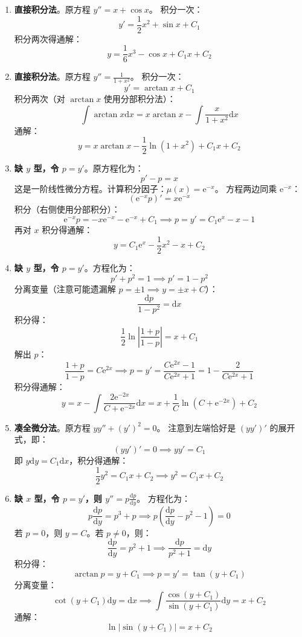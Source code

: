 \documentclass[lang=cn,11pt]{elegantbook}
\begin{document}
\begin{solution}
\begin{enumerate}
    \item[(1)] \textbf{直接积分法}。原方程 $y'' = x + \cos x$。
    积分一次：
    \[
    y' = \frac{1}{2}x^2 + \sin x + C_1
    \]
    积分两次得通解：
    \[
    y = \frac{1}{6}x^3 - \cos x + C_1 x + C_2
    \]
    
    \item[(2)] \textbf{直接积分法}。原方程 $y'' = \frac{1}{1+x^2}$。
    积分一次：
    \[
    y' = \arctan x + C_1
    \]
    积分两次（对 $\arctan x$ 使用分部积分法）：
    \[
    \int \arctan x \mathrm{d}x = x\arctan x - \int \frac{x}{1+x^2}\mathrm{d}x
    \]
    通解：
    \[
    y = x\arctan x - \frac{1}{2}\ln(1+x^2) + C_1 x + C_2
    \]
    
    \item[(3)] \textbf{缺 $y$ 型，令 $p=y'$}。原方程化为：
    \[
    p' - p = x
    \]
    这是一阶线性微分方程。计算积分因子：$\mu(x) = \mathrm{e}^{-x}$。
    方程两边同乘 $\mathrm{e}^{-x}$：
    \[
    (\mathrm{e}^{-x}p)' = x\mathrm{e}^{-x}
    \]
    积分（右侧使用分部积分）：
    \[
    \mathrm{e}^{-x}p = -x\mathrm{e}^{-x} - \mathrm{e}^{-x} + C_1 \implies p = y' = C_1\mathrm{e}^x - x - 1
    \]
    再对 $x$ 积分得通解：
    \[
    y = C_1\mathrm{e}^x - \frac{1}{2}x^2 - x + C_2
    \]
    
    \item[(4)] \textbf{缺 $y$ 型，令 $p=y'$}。方程化为：
    \[
    p' + p^2 = 1 \implies p' = 1-p^2
    \]
    分离变量（注意可能遗漏解 $p=\pm1 \implies y=\pm x+C$）：
    \[
    \frac{\mathrm{d}p}{1-p^2} = \mathrm{d}x
    \]
    积分得：
    \[
    \frac{1}{2}\ln\left|\frac{1+p}{1-p}\right| = x + C_1
    \]
    解出 $p$：
    \[
    \frac{1+p}{1-p} = C\mathrm{e}^{2x} \implies p = y' = \frac{C\mathrm{e}^{2x}-1}{C\mathrm{e}^{2x}+1} = 1 - \frac{2}{C\mathrm{e}^{2x}+1}
    \]
    积分得通解：
    \[
    y = x - \int \frac{2\mathrm{e}^{-2x}}{C+\mathrm{e}^{-2x}}\mathrm{d}x = x + \frac{1}{C}\ln(C+\mathrm{e}^{-2x}) + C_2
    \]
    
    \item[(5)] \textbf{凑全微分法}。原方程 $yy'' + (y')^2 = 0$。
    注意到左端恰好是 $(yy')'$ 的展开式，即：
    \[
    (yy')' = 0 \implies yy' = C_1
    \]
    即 $y\mathrm{d}y = C_1\mathrm{d}x$，积分得通解：
    \[
    \frac{1}{2}y^2 = C_1 x + C_2 \implies y^2 = C_1 x + C_2
    \]
    
    \item[(6)] \textbf{缺 $x$ 型，令 $p=y'$，则 $y''=p\frac{\mathrm{d}p}{\mathrm{d}y}$}。
    方程化为：
    \[
    p\frac{\mathrm{d}p}{\mathrm{d}y} = p^3 + p \implies p\left(\frac{\mathrm{d}p}{\mathrm{d}y} - p^2 - 1\right) = 0
    \]
    若 $p=0$，则 $y=C$。若 $p \neq 0$，则：
    \[
    \frac{\mathrm{d}p}{\mathrm{d}y} = p^2 + 1 \implies \frac{\mathrm{d}p}{p^2+1} = \mathrm{d}y
    \]
    积分得：
    \[
    \arctan p = y + C_1 \implies p = y' = \tan(y+C_1)
    \]
    分离变量：
    \[
    \cot(y+C_1)\mathrm{d}y = \mathrm{d}x \implies \int \frac{\cos(y+C_1)}{\sin(y+C_1)}\mathrm{d}y = x + C_2
    \]
    通解：
    \[
    \ln|\sin(y+C_1)| = x + C_2
    \]
\end{enumerate}
\end{solution}
\end{document}
